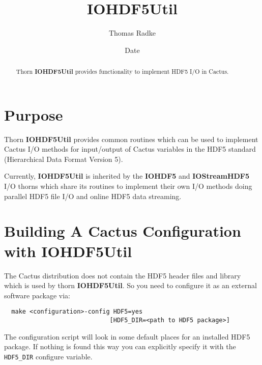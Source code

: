 \documentclass{article}
\begin{document}
\title{IOHDF5Util}
\author{Thomas Radke}
\date{$ $Date$ $}

\maketitle


\begin{abstract}
Thorn {\bf IOHDF5Util} provides functionality to implement HDF5 I/O in Cactus.
\end{abstract}

\section{Purpose}
Thorn {\bf IOHDF5Util} provides common routines which can be used to implement
Cactus I/O methods for input/output of Cactus variables in the HDF5 standard
(Hierarchical Data Format Version 5).

Currently, {\bf IOHDF5Util} is inherited by the {\bf IOHDF5} and
{\bf IOStreamHDF5} I/O thorns which share its routines to implement their own
I/O methods doing parallel HDF5 file I/O and online HDF5 data streaming.
%
%
\section{Building A Cactus Configuration with {\bf IOHDF5Util}}
%
The Cactus distribution does not contain the HDF5 header files and library which
is used by thorn {\bf IOHDF5Util}. So you need to configure it as an external
software package via:
%
\begin{verbatim}
  make <configuration>-config HDF5=yes
                             [HDF5_DIR=<path to HDF5 package>]
\end{verbatim}
%
The configuration script will look in some default places for an installed
HDF5 package. If nothing is found this way you can explicitly specify it with
the {\tt HDF5\_DIR} configure variable.

\end{document}
